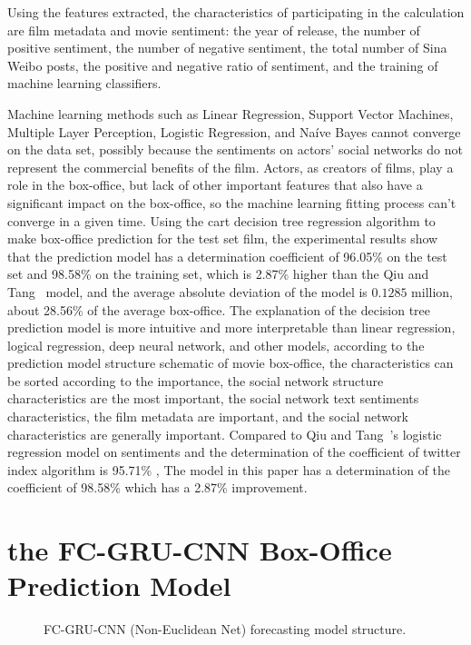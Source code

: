 \documentclass[review]{cvpr}
\begin{document}
Using the features extracted, the characteristics of participating in the calculation are film metadata and movie sentiment:
the year of release, the number of positive sentiment, the number of negative sentiment, the total number of Sina Weibo posts,
the positive and negative ratio of sentiment, and the training of machine learning classifiers.

Machine learning methods such as Linear Regression, Support Vector Machines, Multiple Layer Perception, Logistic Regression, and Na{\'i}ve Bayes cannot converge on the data set,
possibly because the sentiments on actors' social networks do not represent the commercial benefits of the film.
Actors, as creators of films, play a role in the box-office, but lack of other important features that also have a significant impact on the box-office,
so the machine learning fitting process can't converge in a given time.
Using the cart decision tree regression algorithm to make box-office prediction for the test set film,
the experimental results show that the prediction model has a determination coefficient of 96.05\% on the test set and 98.58\% on the training set, which is 2.87\% higher than the Qiu and Tang~\cite{qiu2018microblog} model,
and the average absolute deviation of the model is $0.1285$ million, about 28.56\% of the average box-office.
The explanation of the decision tree prediction model is more intuitive and more interpretable than linear regression, logical regression, deep neural network, and other models,
according to the prediction model structure schematic of movie box-office,
the characteristics can be sorted according to the importance, the social network structure characteristics are the most important,
the social network text sentiments characteristics, the film metadata are important, and the social network characteristics are generally important.
Compared to Qiu and Tang~\cite{qiu2018microblog}'s logistic regression model on sentiments and the determination of the coefficient of twitter index algorithm is 95.71\% ,
The model in this paper has a determination of the coefficient of 98.58\% which has a 2.87\% improvement.

\section{the FC-GRU-CNN Box-Office Prediction Model}


\begin{figure*}
\begin{center}
\end{center}
   \caption{FC-GRU-CNN (Non-Euclidean Net) forecasting model structure.}
\label{fig:short}
\end{figure*}
\end{document}

